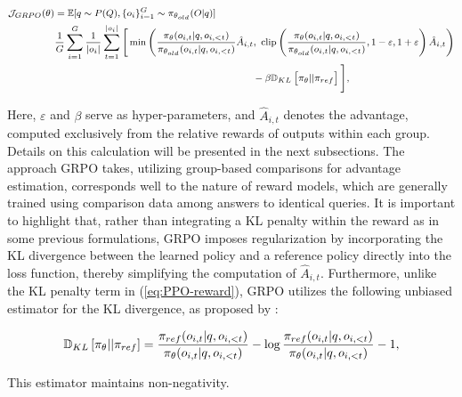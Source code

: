 \begin{itemize}[topsep=0pt]
\begin{equation}
\footnotesize
\begin{split}
    \mathcal{J}_{GRPO}(\theta) &= \mathbb{E}{[q \sim P(Q), \{o_i\}_{i=1}^G \sim \pi_{\theta_{old}}(O|q)]}  \\
    & \frac{1}{G}\sum_{i=1}^G\frac{1}{|o_i|} \sum_{t=1}^{|o_i|} \Bigg[ \min \left( \frac{\pi_\theta(o_{i,t} | q, o_{i,<t})}{\pi_{\theta_{old}}(o_{i,t} | q, o_{i,<t})} \hat{A}_{i,t},\ \text{clip}\left( \frac{\pi_\theta(o_{i,t} | q, o_{i,<t})}{\pi_{\theta_{old}}(o_{i,t} | q, o_{i,<t})}, 1 - \varepsilon, 1 + \varepsilon \right) \hat{A}_{i,t} \right)  \\
    &\hspace{6cm} - \beta \mathbb{D}_{KL} \left[\pi_{\theta} || \pi_{ref}\right] \Bigg] ,
\end{split}
\label{eq:GRPO-obj}
\end{equation}

Here, $\varepsilon$ and $\beta$ serve as hyper-parameters, and $\hat{A}_{i,t}$ denotes the advantage, computed exclusively from the relative rewards of outputs within each group. Details on this calculation will be presented in the next subsections. The approach GRPO takes, utilizing group-based comparisons for advantage estimation, corresponds well to the nature of reward models, which are generally trained using comparison data among answers to identical queries. It is important to highlight that, rather than integrating a KL penalty within the reward as in some previous formulations, GRPO imposes regularization by incorporating the KL divergence between the learned policy and a reference policy directly into the loss function, thereby simplifying the computation of $\hat{A}_{i,t}$. Furthermore, unlike the KL penalty term in (\ref{eq:PPO-reward}), GRPO utilizes the following unbiased estimator for the KL divergence, as proposed by \citet{kl_approx}:

\begin{equation}
\small
    \mathbb{D}_{KL}\left[\pi_{\theta} || \pi_{ref}\right] = \frac{\pi_{ref}(o_{i,t}|q,o_{i,<t})}{\pi_{\theta}(o_{i,t}|q,o_{i,<t})}- \log\frac{\pi_{ref}(o_{i,t}|q,o_{i,<t})}{\pi_{\theta}(o_{i,t}|q,o_{i,<t})} - 1,
\end{equation}

This estimator maintains non-negativity.


\end{itemize}
